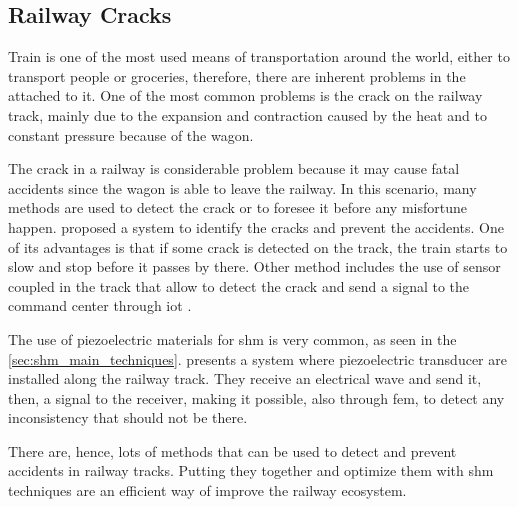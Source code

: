 \subsection{Railway Cracks}

Train is one of the most used means of transportation around the world, either to transport people or groceries, therefore, there are inherent problems in the attached to it. 
One of the most common problems is the crack on the railway track, mainly due to the expansion and contraction caused by the heat and to constant pressure because of the wagon.

The crack in a railway is considerable problem because it may cause fatal accidents since the wagon is able to leave the railway. In this scenario, many methods are used to detect the crack or to foresee it before any misfortune happen. \citet{karthick2017} proposed a system to identify the cracks and prevent the accidents. One of its advantages is that if some crack is detected on the track, the train starts to slow and stop before it passes by there. Other method includes the use of sensor coupled in the track that allow to detect the crack and send a signal to the command center through \gls*{iot} \citep{sakenabenazer2021}.

The use of piezoelectric materials for \gls*{shm} is very common, as seen in the \cref{sec:shm_main_techniques}. \citet{loveday2000} presents a system where piezoelectric transducer are installed along the railway track. 
They receive an electrical wave and send it, then, a signal to the receiver, making it possible, also through \gls*{fem}, to detect any inconsistency that should not be there.

There are, hence, lots of methods that can be used to detect and prevent accidents in railway tracks. Putting they together and optimize them with \gls*{shm} techniques are an efficient way of improve the railway ecosystem.